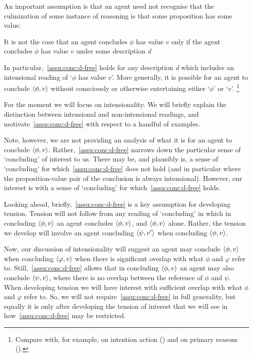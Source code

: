 \begin{note}[Descriptions]
  An important assumption is that an agent need not recognise that the culmination of some instance of reasoning is that some proposition has some value.

  \begin{assumption}
    \label{assu:conc:d-free}
    It is not the case that an agent concludes \(\phi\) has value \(v\) only if the agent concludes \(\phi\) has value \(v\) under some description \emph{d}
  \end{assumption}

  In particular,~\autoref{assu:conc:d-free} holds for any description \emph{d} which includes an intensional reading of `\(\phi\) has value \(v\)'.
  More generally, it is possible for an agent to conclude \(\langle \phi, v \rangle\) without consciously or otherwise entertaining either `\(\phi\)' or `\(v\)'.%
  \footnote{
    Compare with, for example, \citeauthor{Anscombe:1957aa} on intention action (\citeyear[\S19]{Anscombe:1957aa}) and \citeauthor{Davidson:1963aa} on primary reasons (\citeyear[5]{Davidson:1963aa}).
  }

  For the moment we will focus on intensionality.
  We will briefly explain the distinction between intensional and non-intensional readings, and motivate~\autoref{assu:conc:d-free} with respect to a handful of examples.

  Note, however, we are not providing an analysis of what it is for an agent to conclude \(\langle \phi, v \rangle\).
  Rather,~\autoref{assu:conc:d-free} narrows down the particular sense of `concluding' of interest to us.
  There may be, and plausibly is, a sense of `concluding' for which~\autoref{assu:conc:d-free} does not hold (and in particular where the proposition-value pair of the conclusion is always intensional).
  However, our interest is with a sense of `concluding' for which~\autoref{assu:conc:d-free} holds.
\end{note}

\begin{note}
  Looking ahead, briefly,~\autoref{assu:conc:d-free} is a key assumption for developing tension.
  Tension will not follow from any reading of `concluding' in which in concluding \(\langle \phi, v \rangle\) an agent concludes \(\langle \phi, v \rangle\), and \(\langle \phi, v \rangle\) alone.
  Rather, the tension we develop will involve an agent concluding \(\langle \psi, v' \rangle\) when concluding \(\langle \phi, v \rangle\).

  Now, our discussion of intensionality will suggest an agent may conclude \(\langle \phi, v \rangle\) when concluding \(\langle \varphi, v \rangle\) when there is significant overlap with what \(\phi\) and \(\varphi\) refer to.
  Still,~\autoref{assu:conc:d-free} allows that in concluding \(\langle \phi, v \rangle\) an agent may also conclude \(\langle \psi, v \rangle\), where there is no overlap between the reference of \(\phi\) and \(\psi\).
  When developing tension we will have interest with sufficient overlap with what \(\phi\) and \(\varphi\) refer to.
  So, we will not require~\autoref{assu:conc:d-free} in full generality, but equally it is only after developing the tension of interest that we will see in how~\autoref{assu:conc:d-free} may be restricted.
\end{note}

